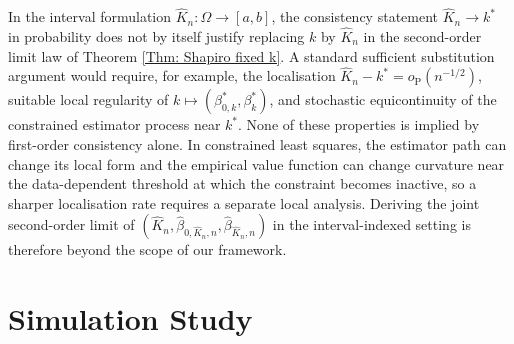 \documentclass[12pt]{article}
\newenvironment{bluechange}{\begingroup\color[rgb]{0.00,0.00,1.00}}{\endgroup}
\theoremstyle{remark}
\theoremstyle{plain}
\begin{document}
\begin{bluechange}
In the interval
formulation $\hat{K}_{n}:\Omega\to[a,b]$, the consistency statement $\hat{K}_{n}\to k^{*}$
in probability does not by itself justify replacing $k$ by $\hat{K}_{n}$
in the second-order limit law of Theorem \ref{Thm: Shapiro fixed k}.
A standard sufficient substitution argument would require, for example, the localisation
$\hat{K}_{n}-k^{*}=o_{\mathrm{P}}(n^{-1/2})$, suitable local regularity of
$k\mapsto(\beta_{0,k}^{*},\beta_{k}^{*})$, and stochastic equicontinuity of the constrained estimator process near $k^*$. None of these properties is implied by first-order consistency alone. In constrained least squares, the estimator path can change its local form and the empirical value function can change curvature near the data-dependent threshold at which the constraint becomes inactive, so a sharper localisation rate requires a separate local analysis. Deriving the joint second-order limit of $\left(\hat{K}_{n},\hat{\beta}_{0,\hat{K}_{n},n},\hat{\beta}_{\hat{K}_{n},n}\right)$ in the interval-indexed setting is therefore beyond the scope of our framework.

\end{bluechange}

\section{Simulation Study} \label{Sect: Simulation}
\end{document}
